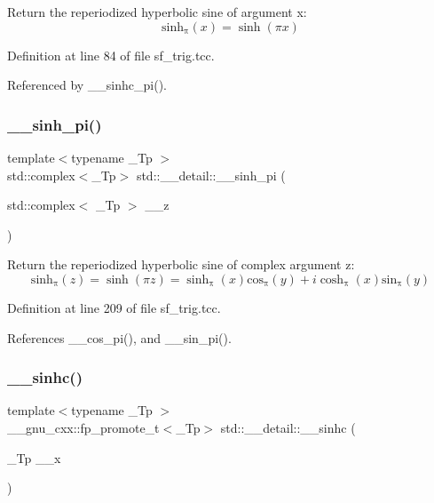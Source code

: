 Return the reperiodized hyperbolic sine of argument x\+: \[ \mathrm{sinh_\pi}(x) = \sinh(\pi x) \] 

Definition at line 84 of file sf\+\_\+trig.\+tcc.



Referenced by \+\_\+\+\_\+sinhc\+\_\+pi().

\mbox{\label{namespacestd_1_1____detail_aa8fe06b3d9584ea9c81b0349ba7eb2dc}} 
\subsubsection{\texorpdfstring{\+\_\+\+\_\+sinh\+\_\+pi()}{\_\_sinh\_pi()}\hspace{0.1cm}{\footnotesize\ttfamily [2/2]}}
{\footnotesize\ttfamily template$<$typename \+\_\+\+Tp $>$ \\
std\+::complex$<$\+\_\+\+Tp$>$ std\+::\+\_\+\+\_\+detail\+::\+\_\+\+\_\+sinh\+\_\+pi (\begin{DoxyParamCaption}\item[{std\+::complex$<$ \+\_\+\+Tp $>$}]{\+\_\+\+\_\+z }\end{DoxyParamCaption})}

Return the reperiodized hyperbolic sine of complex argument z\+: \[ \mathrm{sinh_\pi}(z) = \sinh(\pi z) = \mathrm{\sinh_\pi}(x) \mathrm{cos_\pi}(y) + i \mathrm{\cosh_\pi}(x) \mathrm{sin_\pi}(y) \] 

Definition at line 209 of file sf\+\_\+trig.\+tcc.



References \+\_\+\+\_\+cos\+\_\+pi(), and \+\_\+\+\_\+sin\+\_\+pi().

\mbox{\label{namespacestd_1_1____detail_a65db661ebfae979e916e2f4481e6866c}} 
\subsubsection{\texorpdfstring{\+\_\+\+\_\+sinhc()}{\_\_sinhc()}}
{\footnotesize\ttfamily template$<$typename \+\_\+\+Tp $>$ \\
\+\_\+\+\_\+gnu\+\_\+cxx\+::fp\+\_\+promote\+\_\+t$<$\+\_\+\+Tp$>$ std\+::\+\_\+\+\_\+detail\+::\+\_\+\+\_\+sinhc (\begin{DoxyParamCaption}\item[{\+\_\+\+Tp}]{\+\_\+\+\_\+x }\end{DoxyParamCaption})}



